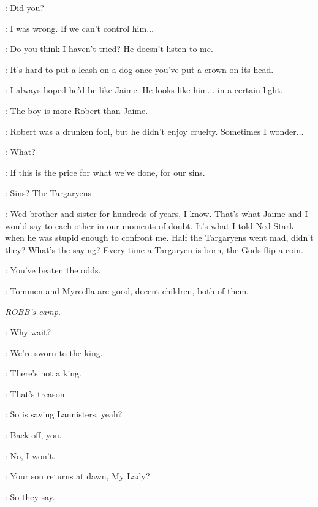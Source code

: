 \CERSEI: Did you?

\TYRION: I was wrong. If we can't control him$\ldots$

\CERSEI: Do you think I haven't tried? He doesn't listen to me.

\TYRION: It's hard to put a leash on a dog once you've put a crown on its head.

\CERSEI: I always hoped he'd be like Jaime. He looks like him$\ldots$ in a certain light.

\TYRION: The boy is more Robert than Jaime.

\CERSEI: Robert was a drunken fool, but he didn't enjoy cruelty. Sometimes I wonder$\ldots$

\TYRION: What?

\CERSEI: If this is the price for what we've done, for our sins.

\TYRION: Sins? The Targaryens-

\CERSEI: Wed brother and sister for hundreds of years, I know. That's what Jaime and I would say to each other in our moments of doubt. It's what I told Ned Stark when he was stupid enough to confront me. Half the Targaryens went mad, didn't they? What's the saying? Every time a Targaryen is born, the Gods flip a coin.

\TYRION: You've beaten the odds.

\CERSEI: Tommen and Myrcella are good, decent children, both of them.



\scene

\textit{ROBB's camp.}


\SOLDIERa: Why wait?

\SOLDIERb: We're sworn to the king.

\SOLDIERa: There's not a king.

\SOLDIERb: That's treason.

\SOLDIERa: So is saving Lannisters, yeah?

\SOLDIERb: Back off, you.

\SOLDIERa: No, I won't.


\BRIENNE: Your son returns at dawn, My Lady?

\CATELYN: So they say.

